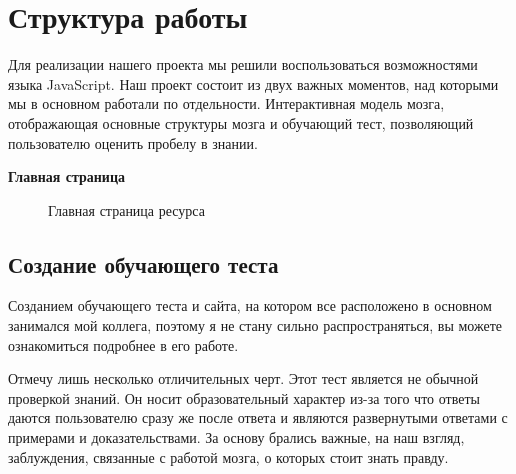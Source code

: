 \newpage
\section{Структура работы}
Для реализации нашего проекта мы решили воспользоваться возможностями языка JavaScript. Наш проект состоит из двух важных моментов, над которыми мы в основном работали по отдельности. Интерактивная модель мозга, отображающая основные структуры мозга и обучающий тест, позволяющий пользователю оценить пробелу в знании. 

\textbf{ Главная страница }


\begin{figure}[H]
	\center{\texttt{[image: 8]}}
	\caption{Главная страница ресурса}
	\label{ris:m}
\end{figure}


\subsection{Создание обучающего теста}
Созданием обучающего теста и сайта, на котором все расположено в основном занимался мой коллега, поэтому я не стану сильно распространяться, вы можете ознакомиться подробнее в его работе. 

Отмечу лишь несколько отличительных черт. Этот тест является не обычной проверкой знаний. Он носит образовательный характер из-за того что ответы даются пользователю сразу же после ответа и являются развернутыми ответами с примерами и доказательствами. За основу брались важные, на наш взгляд, заблуждения, связанные с работой мозга, о которых стоит знать правду.  




